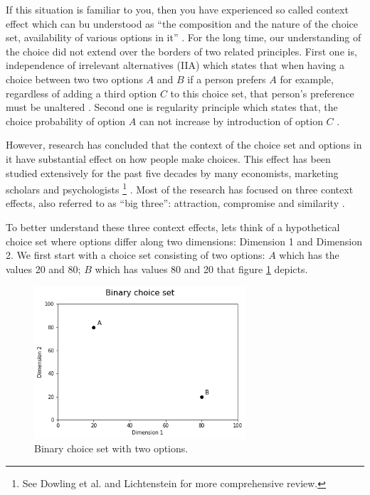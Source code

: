 \documentclass[a4paper,12pt]{article}
\newcommand{\citeyearonly}[1]{\citeyearpar{#1}}
\begin{document}
If this situation is familiar to you, then you have experienced so called context effect which can bu understood as ``the composition  and the nature of the choice set, availability of various options in it'' \citep{tversky1972elimination, huberPuto83}. For the long time, our understanding of the choice did not extend over the borders of two related principles. First one is, independence of irrelevant alternatives (IIA) which states that when having a choice between two two options $A$ and $B$ if a person prefers $A$ for example, regardless of adding a third option $C$ to this choice set, that person's preference must be unaltered \citep{luce59}. Second one is regularity principle which states that, the choice probability of option $A$ can not increase by introduction of option $C$ \citep{luce59}.

However, research has concluded that the context of the choice set and options in it have substantial effect on how people make choices. This effect has been studied extensively for the past five decades by many economists, marketing scholars and psychologists \footnote{See Dowling et al. \citeyearonly{dowlingEtAl20} and Lichtenstein \citeyearonly{lichtenstein2006construction} for more comprehensive review.} \citep{ kahnemanTversky79, simonson89, tverskySimonson93, lichtenstein2006construction, dowlingEtAl20}. Most of the research has focused on three context effects, also referred to as ``big three'': attraction, compromise and similarity \citep{howes2016contextual}.

To better understand these three context effects, lets think of a hypothetical choice set where options differ along two dimensions: Dimension 1 and Dimension 2. We first start with a choice set consisting of two options: $A$ which has the values 20 and 80; $B$ which has values 80 and 20 that figure \ref{fig:binaryChoiseSet} depicts. 

\begin{figure}[h]
    \centering
    \includegraphics[width=0.7\textwidth]{staticFiles/noEffect.png}
    \caption{Binary choice set with two options.} %
    \label{fig:binaryChoiseSet} %

\end{figure}
\end{document}
